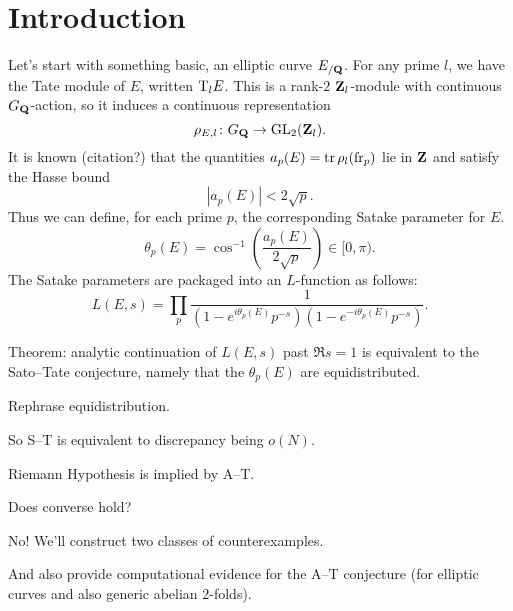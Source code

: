
\chapter{Introduction}





Let's start with something basic, an elliptic curve $E_{/\mathbf{Q}}$. For any 
prime $l$, we have the Tate module of $E$, written $\mathrm{T}_l E$. This is a 
rank-$2$ $\mathbf{Z}_l$-module with continuous $G_{\mathbf{Q}}$-action, so it induces a 
continuous representation 
\[
	\rho_{E,l} \colon G_{\mathbf{Q}} \to \operatorname{GL}_2(\mathbf{Z}_l) .
\]
It is known (citation?) that the quantities $a_p(E) = \operatorname{tr} \rho_l(\mathrm{fr}_p)$ lie 
in $\mathbf{Z}$ and satisfy the Hasse bound 
\[
	|a_p(E)| < 2\sqrt p .
\]
Thus we can define, for each prime $p$, the corresponding Satake parameter for 
$E$. 
\[
	\theta_p(E) = \cos^{-1}\left(\frac{a_p(E)}{2\sqrt p}\right) \in [0,\pi) .
\]
The Satake parameters are packaged into an $L$-function as follows:
\[
	L(E,s) = \prod_p \frac{1}{(1 - e^{i \theta_p(E)} p^{-s})(1- e^{-i \theta_p(E)} p^{-s})} .
\]

Theorem: analytic continuation of $L(E,s)$ past $\Re s=1$ is equivalent to the 
Sato--Tate conjecture, namely that the $\theta_p(E)$ are equidistributed. 

Rephrase equidistribution. 

So S--T is equivalent to discrepancy being $o(N)$. 

Riemann Hypothesis is implied by A--T. 

Does converse hold?

No! We'll construct two classes of counterexamples. 

And also provide computational evidence for the A--T conjecture (for elliptic 
curves and also generic abelian $2$-folds). 